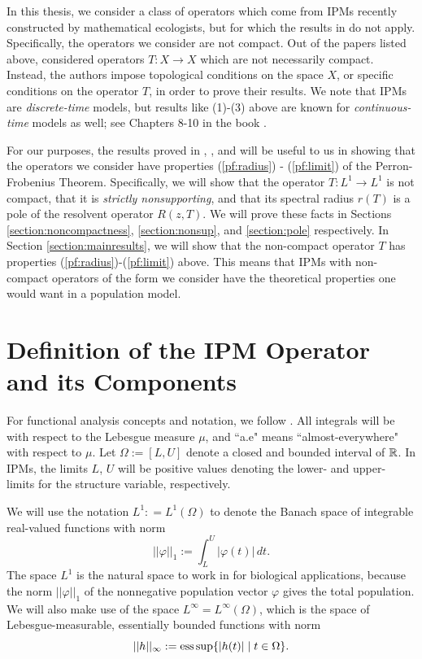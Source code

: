 In this thesis, we consider a class of operators which come from IPMs recently constructed by mathematical ecologists, but for which the results in \cite{Ellner2006} do not apply. Specifically, the operators we consider are not compact. Out of the papers listed above, \cite{Bonsall1958, Edmunds1972, Karlin1959, Kras1989, Marek1967, Marek1970, Raghavan1965, Sawashima1964, Schaefer1960} considered operators $T:X \to X$ which are not necessarily compact. Instead, the authors impose topological conditions on the space $X$, or specific conditions on the operator $T$, in order to prove their results.  We note that IPMs are \emph{discrete-time} models, but results like (1)-(3) above are known for \emph{continuous-time} models as well; see Chapters 8-10 in the book \cite{Clement1987}. 

For our purposes, the results proved in \cite{Marek1970}, \cite{Sawashima1964}, and \cite{Schaefer1960} will be useful to us in showing that the operators we consider have properties (\ref{pf:radius}) - (\ref{pf:limit}) of the Perron-Frobenius Theorem. Specifically, we will show that the operator $T:L^1 \to L^1$ is not compact, that it is \emph{strictly nonsupporting}, and that its spectral radius $r(T)$ is a pole of the resolvent operator $R(z, T)$. We will prove these facts in Sections \ref{section:noncompactness}, \ref{section:nonsup}, and \ref{section:pole} respectively. In Section \ref{section:mainresults}, we will show that the non-compact operator $T$ has properties (\ref{pf:radius})-(\ref{pf:limit}) above. This means that IPMs with non-compact operators of the form we consider have the theoretical properties one would want in a population model.

\section{Definition of the IPM Operator and its Components} \label{section:operatordef}

For functional analysis concepts and notation, we follow \cite{Conway1994}. All integrals will be with respect to the Lebesgue measure $\mu$, and ``a.e" means ``almost-everywhere" with respect to $\mu$. Let $\Omega := [L,U]$ denote a closed and bounded interval of $\mathbb{R}$. In IPMs, the limits $L$, $U$ will be positive values denoting the lower- and upper- limits for the structure variable, respectively.

We will use the notation $L^1 : = L^1(\Omega)$ to denote the Banach space of integrable real-valued functions with norm
\[||\varphi||_1 := \int_L^U |\varphi(t)| \, dt.\]
The space $L^1$ is the natural space to work in for biological applications, because the norm $||\varphi||_1$ of the nonnegative population vector $\varphi$ gives the total population. We will also make use of the space $L^\infty = L^\infty(\Omega)$, which is the space of Lebesgue-measurable, essentially bounded functions with norm
\[||h||_\infty := \operatorname{ess \, sup} \{|h(t)| \mid t \in \Omega\}.\]

